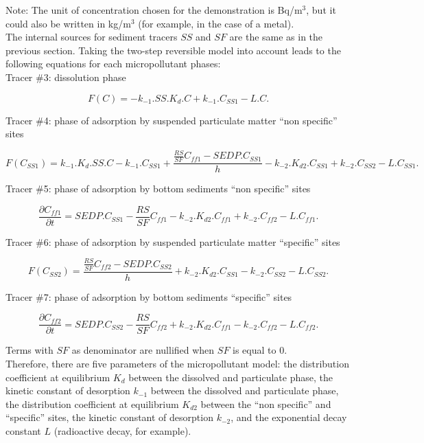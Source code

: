 Note: The unit of concentration chosen for the demonstration is Bq/m$^3$,
but it could also be written in kg/m$^3$ (for example, in the case of a metal).\\

The internal sources for sediment tracers $SS$ and $SF$ are the same as in the previous
section.
Taking the two-step reversible model into account leads to the following equations
for each micropollutant phases:\\

Tracer $\#$3: dissolution phase

\begin{equation}
  F(C) = -k_{-1}.SS.K_d.C + k_{-1}.C_{SS1} - L.C.
\end{equation}

Tracer $\#$4: phase of adsorption by suspended particulate matter ``non specific'' sites

\begin{equation}
  F(C_{SS1}) = k_{-1}.K_d.SS.C - k_{-1}.C_{SS1} + \frac{\frac{RS}{SF}C_{ff1}-SEDP.C_{SS1}}{h} -
  k_{-2}.K_{d2}.C_{SS1} + k_{-2}.C_{SS2} - L.C_{SS1}.
\end{equation}

Tracer $\#$5: phase of adsorption by bottom sediments ``non specific'' sites

\begin{equation}
  \frac{\partial C_{ff1}}{\partial t} = SEDP.C_{SS1} - \frac{RS}{SF} C_{ff1} -
  k_{-2}.K_{d2}.C_{ff1} + k_{-2}.C_{ff2} - L.C_{ff1}.
\end{equation}

Tracer $\#$6: phase of adsorption by suspended particulate matter ``specific'' sites

\begin{equation}
  F(C_{SS2}) = \frac{\frac{RS}{SF}C_{ff2}-SEDP.C_{SS2}}{h} +
  k_{-2}.K_{d2}.C_{SS1} - k_{-2}.C_{SS2} - L.C_{SS2}.
\end{equation}

Tracer $\#$7: phase of adsorption by bottom sediments ``specific'' sites

\begin{equation}
  \frac{\partial C_{ff2}}{\partial t} = SEDP.C_{SS2} - \frac{RS}{SF} C_{ff2} +
  k_{-2}.K_{d2}.C_{ff1} - k_{-2}.C_{ff2} - L.C_{ff2}.
\end{equation}

Terms with $SF$ as denominator are nullified when $SF$ is equal to 0.\\

Therefore, there are five parameters of the micropollutant model:
the distribution coefficient at equilibrium $K_d$ between the dissolved and
particulate phase,
the kinetic constant of desorption $k_{-1}$ between the dissolved and particulate phase,
the distribution coefficient at equilibrium $K_{d2}$ between the ``non specific'' and
``specific'' sites,
the kinetic constant of desorption $k_{-2}$,
and the exponential decay constant $L$ (radioactive decay, for example).


